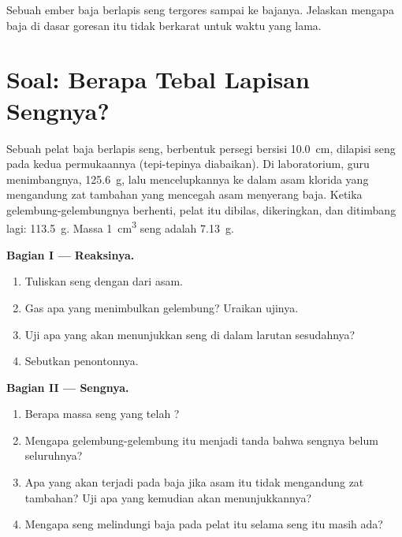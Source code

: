 \begin{exercise}[$\star\star\star$]\label{exo:g9:metals-acids-corrosion:12}
Sebuah ember baja berlapis seng tergores sampai ke bajanya. Jelaskan
mengapa baja di dasar goresan itu tidak berkarat untuk waktu yang lama.
\end{exercise}

\section{Soal: Berapa Tebal Lapisan Sengnya?}

\begin{problem}
\label{pb:g9:metals-acids-corrosion:1}
Sebuah pelat baja berlapis seng, berbentuk persegi bersisi
\qty{10.0}{cm}, dilapisi seng pada kedua permukaannya (tepi-tepinya
diabaikan). Di laboratorium, guru menimbangnya, \qty{125.6}{g}, lalu
mencelupkannya ke dalam asam klorida yang mengandung zat tambahan yang
mencegah asam menyerang baja. Ketika gelembung-gelembungnya berhenti,
pelat itu dibilas, dikeringkan, dan ditimbang lagi: \qty{113.5}{g}.
Massa \qty{1}{cm^3} seng adalah \qty{7.13}{g}.

\medskip
\noindent\textbf{Bagian I --- Reaksinya.}
\begin{enumerate}
  \item Tuliskan  seng dengan   dari asam.
  \item Gas apa yang menimbulkan gelembung? Uraikan ujinya.
  \item Uji apa yang akan menunjukkan  seng di dalam larutan
        sesudahnya?
  \item Sebutkan  penontonnya.
\end{enumerate}

\medskip
\noindent\textbf{Bagian II --- Sengnya.}
\begin{enumerate}[resume]
  \item Berapa massa seng yang telah ?
  \item Mengapa gelembung-gelembung itu menjadi tanda bahwa sengnya belum
         seluruhnya?
  \item Apa yang akan terjadi pada baja jika asam itu tidak mengandung
        zat tambahan? Uji apa yang kemudian akan menunjukkannya?
  \item Mengapa seng melindungi baja pada pelat itu selama seng itu masih
        ada?
\end{enumerate}


\end{problem}
